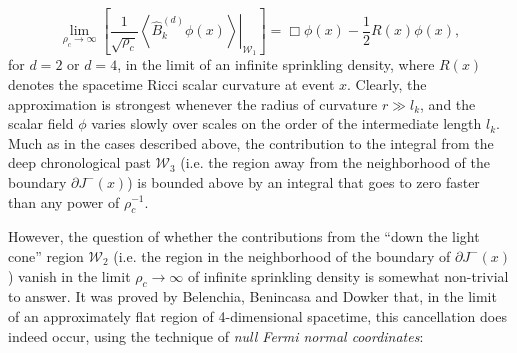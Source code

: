 \documentclass{article}
\begin{document}
\begin{equation}
\lim_{\rho_c \to \infty} \left[ \frac{1}{\sqrt{\rho_c}} \left. \left\langle \hat{B}_{k}^{\left( d \right)} \phi \left( x \right) \right\rangle \right\rvert_{\mathcal{W}_1} \right] = \Box \phi \left( x \right) - \frac{1}{2} R \left( x \right) \phi \left( x \right),
\end{equation}
for ${d = 2}$ or ${d = 4}$, in the limit of an infinite sprinkling density, where ${R \left( x \right)}$ denotes the spacetime Ricci scalar curvature at event $x$. Clearly, the approximation is strongest whenever the radius of curvature ${r \gg l_k}$, and the scalar field ${\phi}$ varies slowly over scales on the order of the intermediate length ${l_k}$. Much as in the cases described above, the contribution to the integral from the deep chronological past ${\mathcal{W}_3}$ (i.e. the region away from the neighborhood of the boundary ${\partial J^{-} \left( x \right)}$) is bounded above by an integral that goes to zero faster than any power of ${\rho_{c}^{-1}}$.

However, the question of whether the contributions from the ``down the light cone'' region ${\mathcal{W}_2}$ (i.e. the region in the neighborhood of the boundary of ${\partial J^{-} \left( x \right)}$) vanish in the limit ${\rho_c \to \infty}$ of infinite sprinkling density is somewhat non-trivial to answer. It was proved by Belenchia, Benincasa and Dowker\cite{belenchia} that, in the limit of an approximately flat region of 4-dimensional spacetime, this cancellation does indeed occur, using the technique of \textit{null Fermi normal coordinates}:
\end{document}
